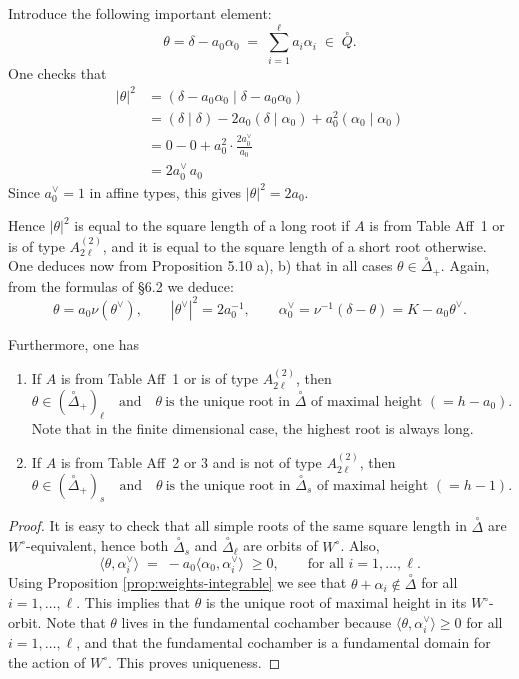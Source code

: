 \documentclass[12pt]{article}
\begin{document}
Introduce the following important element:
\[
\theta = \delta - a_0 \alpha_0 \;=\; \sum_{i=1}^\ell a_i \alpha_i \;\in\; \overset{\circ}{Q}.
\]
One checks that 
\begin{align*}
|\theta|^2
&=(\delta-a_0\alpha_0\mid \delta-a_0\alpha_0) \\
&=(\delta\mid\delta) -2a_0(\delta\mid\alpha_0)+a_0^2(\alpha_0\mid\alpha_0) \\
&=0-0+a_0^2\cdot \frac{2a_0^\vee}{a_0} \\
&=2a_0^\vee\,a_0
\end{align*}
Since $a_0^\vee=1$ in affine types, this gives $|\theta|^2=2a_0$.

Hence $|\theta|^2$ is equal to the square length of a long root if $A$ is from Table Aff~1 or is of type $A_{2\ell}^{(2)}$, and it is equal to the square length of a short root otherwise. One deduces now from Proposition 5.10 a), b) that in all cases 
$\theta \in \overset{\circ}{\Delta}_+$. Again, from the formulas of §6.2 we deduce:
\[
\theta = a_0 \nu(\theta^\vee), 
\qquad 
|\theta^\vee|^2 = 2a_0^{-1}, 
\qquad 
\alpha_0^\vee = \nu^{-1}(\delta - \theta) = K - a_0 \theta^\vee.
\]

Furthermore, one has

\begin{proposition}[6.4]
    \leavevmode
\begin{enumerate}[label=\alph*)]
\item If $A$ is from Table Aff~1 or is of type $A_{2\ell}^{(2)}$, then 
\[
\theta \in (\overset{\circ}{\Delta}_+)_{\ell}
\quad \text{and} \quad
\theta \ \text{is the unique root in } \overset{\circ}{\Delta} \text{ of maximal height } (=h-a_0).
\]
Note that in the finite dimensional case, the highest root is always long.

\item If $A$ is from Table Aff~2 or 3 and is not of type $A_{2\ell}^{(2)}$, then 
\[
\theta \in (\overset{\circ}{\Delta}_+)_{s}
\quad \text{and} \quad
\theta \ \text{is the unique root in } \overset{\circ}{\Delta}_s \text{ of maximal height } (=h-1).
\]
\end{enumerate}
\end{proposition}

\begin{proof}
It is easy to check that all simple roots of the same square length in $\overset{\circ}{\Delta}$ are 
$W^\circ$-equivalent, hence both $\overset{\circ}{\Delta}_s$ and $\overset{\circ}{\Delta}_\ell$ are orbits of $W^\circ$. Also,
\[
\langle \theta, \alpha_i^\vee \rangle \;=\; -a_0 \langle \alpha_0, \alpha_i^\vee \rangle \;\geq 0, 
\qquad \text{for all } i=1,\dots,\ell.
\]
Using Proposition \ref{prop:weights-integrable} we see that $\theta + \alpha_i \notin \overset{\circ}{\Delta}$ for all $i=1,\dots,\ell$.
This implies that $\theta$ is the unique root of maximal height in its $W^\circ$-orbit. Note that $\theta$ lives in the fundamental cochamber because $\langle \theta, \alpha_i^\vee \rangle \geq 0$ for all $i=1,\dots,\ell$, and that the fundamental cochamber is a fundamental domain for the action of $W^\circ$. This proves uniqueness.
\end{proof}
\end{document}
